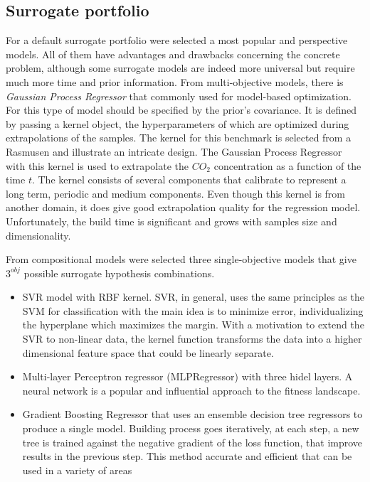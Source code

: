 
    \subsection{Surrogate portfolio}
        For a default surrogate portfolio were selected a most popular and perspective models. All of them have advantages and drawbacks concerning the concrete problem, although some surrogate models are indeed more universal but require much more time and prior information. From multi-objective models, there is \emph{Gaussian Process Regressor} that commonly used for model-based optimization. For this type of model should be specified by the prior's covariance. It is defined by passing a kernel object, the hyperparameters of which are optimized during extrapolations of the samples. The kernel for this benchmark is selected from a Rasmusen and illustrate an intricate design. The Gaussian Process Regressor with this kernel is used to extrapolate the $CO_2$ concentration as a function of the time $t$. The kernel consists of several components that calibrate to represent a long term, periodic and medium components. Even though this kernel is from another domain, it does give good extrapolation quality for the regression model. Unfortunately, the build time is significant and grows with samples size and dimensionality.

        From compositional models were selected three single-objective models that give $3^{obj}$ possible surrogate hypothesis combinations. 
        \begin{itemize}
            \item SVR model with RBF kernel. SVR, in general, uses the same principles as the SVM for classification with the main idea is to minimize error, individualizing the hyperplane which maximizes the margin. With a motivation to extend the SVR to non-linear data, the kernel function transforms the data into a higher dimensional feature space that could be linearly separate.
            \item Multi-layer Perceptron regressor (MLPRegressor) with three hidel layers. A neural network is a popular and influential approach to the fitness landscape.
            \item Gradient Boosting Regressor that uses an ensemble decision tree regressors to produce a single model. Building process goes iteratively, at each step, a new tree is trained against the negative gradient of the loss function, that improve results in the previous step. This method accurate and efficient that can be used in a variety of areas
        \end{itemize}
        
